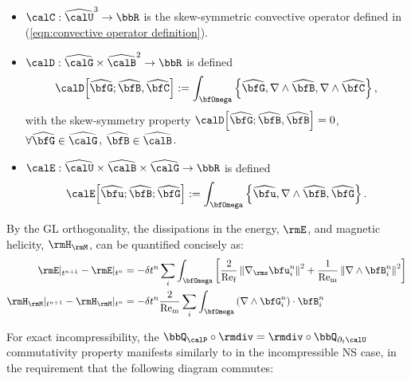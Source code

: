 \begin{example}
        \begin{itemize}
            \item  $\calC : \widehat{\calU}^{3} \rightarrow \bbR$ is the skew-symmetric convective operator defined in (\ref{eqn:convective operator definition}).
            \item  $\calD : \widehat{\calG}\times\widehat{\calB}^{2} \rightarrow \bbR$ is defined
            \begin{equation}
                \calD\!\left[\widehat{\bfG}; \widehat{\bfB}, \widehat{\bfC}\right]
                :=
                \int_{\bfOmega}\left\{\widehat{\bfG}, \nabla\wedge\widehat{\bfB}, \nabla\wedge\widehat{\bfC}\right\},
            \end{equation}
            with the skew-symmetry property $\calD\!\left[\widehat{\bfG}; \widehat{\bfB}, \widehat{\bfB}\right]  =  0$, $\forall \widehat{\bfG} \in \widehat{\calG}$, $\widehat{\bfB} \in \widehat{\calB}$.
            \item  $\calE : \widehat{\calU}\times\widehat{\calB}\times\widehat{\calG} \rightarrow \bbR$ is defined
            \begin{equation}
                \calE\!\left[\widehat{\bfu}; \widehat{\bfB}; \widehat{\bfG}\right]
                :=
                \int_{\bfOmega}\left\{\widehat{\bfu}, \nabla\wedge\widehat{\bfB}, \widehat{\bfG}\right\}.
            \end{equation}
        \end{itemize}

        By the GL orthogonality, the dissipations in the energy, $\rmE$, and magnetic helicity, $\rmH_{\rmM}$, can be quantified concisely as:
        \begin{align}
                   \rmE|_{t^{n + 1}} -        \rmE|_{t^{n}}  &=  - \delta t^{n}\sum_{i}\int_{\bfOmega}\left[\frac{2}{\rmRef}\left\|\nabla_{\rms}\bfu_{i}^{n}\right\|^{2} + \frac{1}{\rmRem}\left\|\nabla\wedge\bfB_{i}^{n}\right\|^{2}\right]  \\
            \rmH_{\rmM}|_{t^{n + 1}} - \rmH_{\rmM}|_{t^{n}}  &=  - \delta t^{n}\frac{2}{\rmRem}\sum_{i}\int_{\bfOmega}\left(\nabla\wedge\bfG_{i}^{n}\right)\cdot\bfB_{i}^{n}
        \end{align}

        For exact incompressibility, the $\bbQ_{\calP}\circ\rmdiv = \rmdiv\circ\bbQ_{\partial_{t}\calU}$ commutativity property manifests similarly to in the incompressible NS case, in the requirement that the following diagram commutes:
        \begin{center}
\end{center}
\end{example}
